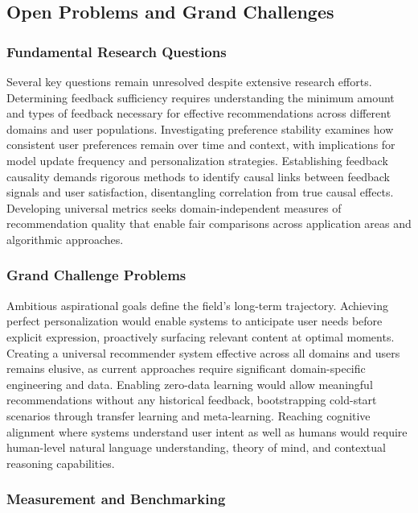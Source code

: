 \subsection{Open Problems and Grand Challenges}

\subsubsection{Fundamental Research Questions}

Several key questions remain unresolved despite extensive research efforts. Determining feedback sufficiency requires understanding the minimum amount and types of feedback necessary for effective recommendations across different domains and user populations. Investigating preference stability examines how consistent user preferences remain over time and context, with implications for model update frequency and personalization strategies. Establishing feedback causality demands rigorous methods to identify causal links between feedback signals and user satisfaction, disentangling correlation from true causal effects. Developing universal metrics seeks domain-independent measures of recommendation quality that enable fair comparisons across application areas and algorithmic approaches.

\subsubsection{Grand Challenge Problems}

Ambitious aspirational goals define the field's long-term trajectory. Achieving perfect personalization would enable systems to anticipate user needs before explicit expression, proactively surfacing relevant content at optimal moments. Creating a universal recommender system effective across all domains and users remains elusive, as current approaches require significant domain-specific engineering and data. Enabling zero-data learning would allow meaningful recommendations without any historical feedback, bootstrapping cold-start scenarios through transfer learning and meta-learning. Reaching cognitive alignment where systems understand user intent as well as humans would require human-level natural language understanding, theory of mind, and contextual reasoning capabilities.

\subsubsection{Measurement and Benchmarking}

